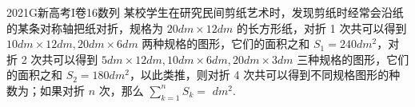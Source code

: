 
\begin{problem}{2021}{G}{新高考I卷}{16}{数列}
某校学生在研究民间剪纸艺术时，发现剪纸时经常会沿纸的某条对称轴把纸对折，规格为 $20dm \times 12dm$ 的长方形纸，对折 1 次共可以得到 $10dm \times 12dm, 20dm \times 6dm$ 两种规格的图形，它们的面积之和 $S_1=240dm^2$，对折 2 次共可以得到 $5dm \times 12dm, 10dm \times 6dm, 20dm \times 3dm$ 三种规格的图形，它们的面积之和 $S_2=180dm^2$，以此类推，则对折 4 次共可以得到不同规格图形的种数为\underline{\hspace{4em}}；如果对折 $n$ 次，那么 $\sum\limits_{k=1}^n S_k=$\underline{\hspace{4em}} $dm^2$.
\end{problem}